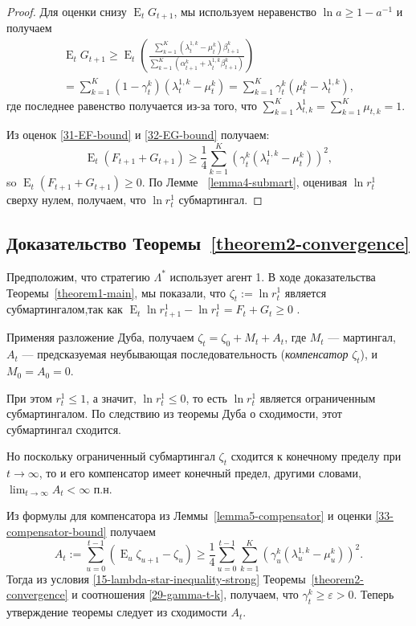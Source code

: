 \documentclass[a4paper,12pt,russian]{article} %
\theoremstyle{definition}
\DeclareMathOperator{\E}{E}
\renewcommand{\epsilon}{\varepsilon}
\begin{document}
\begin{proof}
Для оценки снизу $\E_t G_{t+1}$, мы используем неравенство $\ln a \ge 1 - a^{-1}$ и получаем
\begin{multline}
\label{32-EG-bound}
\E_t G_{t+1} 
\ge \E_t \left( 
  \frac{\sum_{k=1}^K (\lambda_{t}^{1,k} - \mu_{t}^k) \beta_{t+1}^k}
       {\sum_{k=1}^K (\alpha_{t+1}^k + \lambda_{t}^{1,k} \beta_{t+1}^k)}
  \right) \\
= \sum_{k=1}^K (1-\gamma_{t}^k) (\lambda_{t}^{1,k} - \mu_{t}^k) 
= \sum_{k=1}^K \gamma_{t}^k (\mu_{t}^k - \lambda_{t}^{1,k}),
\end{multline}
где последнее равенство получается из-за того, что $\sum_{k=1}^K \lambda_{t,k}^1 = \sum_{k=1}^K \mu_{t,k} = 1$. 

Из оценок \eqref{31-EF-bound} и \eqref{32-EG-bound} получаем:
\begin{equation}
\label{33-compensator-bound}
\E_t(F_{t+1}+G_{t+1}) 
\ge \frac14 \sum_{k=1}^K (\gamma_{t}^k(\lambda_{t}^{1,k} - \mu_{t}^k))^2,
\end{equation}
so $\E_t (F_{t+1}+G_{t+1})\ge 0$.
По Лемме ~\ref{lemma4-submart}, оценивая $\ln r_t^1$ сверху нулем, получаем, что $\ln r_t^1$ субмартингал. 

\end{proof}

\subsection{Доказательство Теоремы~\ref{theorem2-convergence}}
Предположим, что стратегию $\Lambda^*$ использует агент 1.
В ходе доказательства Теоремы~\ref{theorem1-main}, мы показали, что $\zeta_t:=\ln r_t^1$ является субмартингалом,так как $\E_{t}\ln r_{t+1}^1 - \ln r_{t}^1=F_t + G_t \geq 0$ . 

Применяя разложение Дуба, получаем $\zeta_t = \zeta_0 + M_t + A_t$, где $M_t$ — мартингал, $A_t$ — предсказуемая неубывающая последовательность (\emph{компенсатор} $\zeta_t$), и $M_0=A_0=0$.

При этом $r_t^1 \leq 1$, а значит, $\ln r_t^1 \leq 0$, то есть $\ln r_t^1$ является ограниченным субмартингалом. По следствию из теоремы Дуба о сходимости, этот субмартингал сходится.

Но поскольку ограниченный субмартингал $\zeta_t$ сходится к конечному пределу при $t\to\infty$, то и его компенсатор имеет конечный предел, другими словами, \ $\lim_{t\to\infty} A_t < \infty$ п.н.

Из формулы для компенсатора из Леммы~\ref{lemma5-compensator} и оценки \eqref{33-compensator-bound} получаем
\[
A_t := \sum_{u=0}^{t-1} (\E_u\zeta_{u+1} - \zeta_u) 
\ge \frac14 \sum_{u=0}^{t-1} 
  \sum_{k=1}^K (\gamma_{u}^k(\lambda_{u}^{1,k} - \mu_{u}^k))^2.
\]
Тогда из условия \eqref{15-lambda-star-inequality-strong} Теоремы~\ref{theorem2-convergence} и соотношения \eqref{29-gamma-t-k}, получаем, что $\gamma_{t}^k\ge \epsilon>0$.
Теперь утверждение теоремы следует из сходимости $A_t$.
\end{document}
